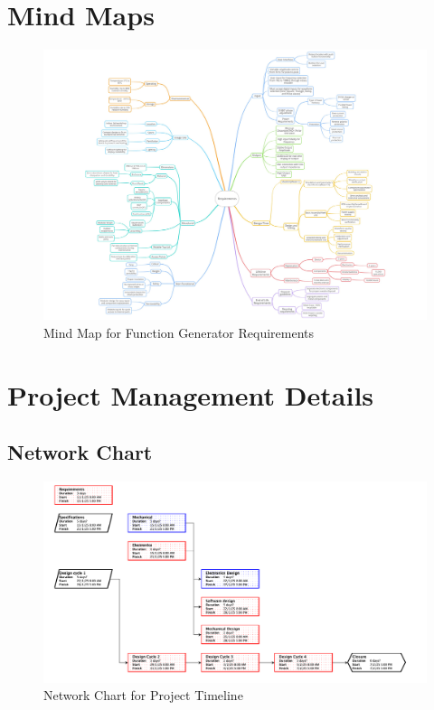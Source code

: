 \documentclass[a4paper,12pt]{article}
\begin{document}
\section{Mind Maps}
\begin{figure}[H]
    \centering
    \includegraphics[width=\textwidth]{mindmap.jpg} %
    \caption{Mind Map for Function Generator Requirements}
    \label{fig:mindmap}
\end{figure}

\newpage
\section{Project Management Details}

\subsection{Network Chart}

\begin{figure}[H]
    \centering
    \includegraphics[width=\textwidth]{Network.png} %
    \caption{Network Chart for Project Timeline}
    \label{fig:network_chart}
\end{figure}
\end{document}
